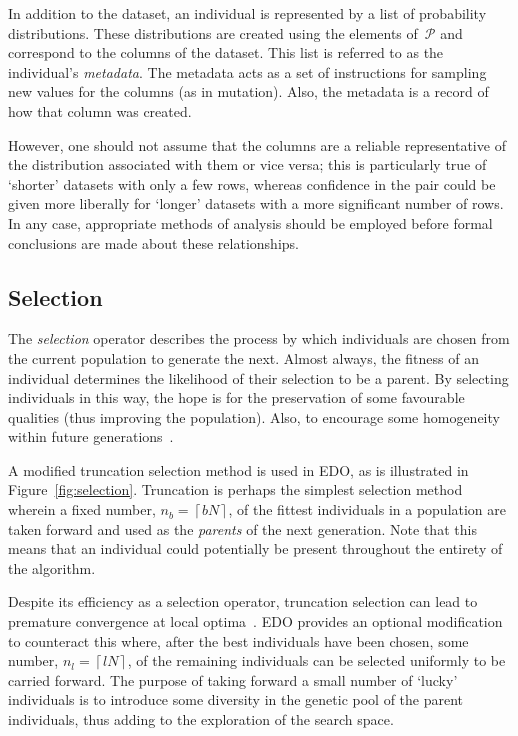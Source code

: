 In addition to the dataset, an individual is represented by a list of
probability distributions. These distributions are created using the elements
of~\(\mathcal{P}\) and correspond to the columns of the dataset. This list is
referred to as the individual's \emph{metadata}. The metadata acts as a set of
instructions for sampling new values for the columns (as in mutation). Also, the
metadata is a record of how that column was created.

However, one should not assume that the columns are a reliable representative of
the distribution associated with them or vice versa; this is particularly true
of `shorter' datasets with only a few rows, whereas confidence in the pair could
be given more liberally for `longer' datasets with a more significant number of
rows. In any case, appropriate methods of analysis should be employed before
formal conclusions are made about these relationships.



\subsection{Selection}

The \emph{selection} operator describes the process by which individuals are
chosen from the current population to generate the next. Almost always, the
fitness of an individual determines the likelihood of their selection to be a
parent. By selecting individuals in this way, the hope is for the preservation
of some favourable qualities (thus improving the population). Also, to encourage
some homogeneity within future generations~\cite{Back1994}.


A modified truncation selection method is used in EDO, as is illustrated in
Figure~\ref{fig:selection}. Truncation is perhaps the simplest selection method
wherein a fixed number, \(n_b = \left\lceil b N\right\rceil\), of the fittest
individuals in a population are taken forward and used as the \emph{parents} of
the next generation. Note that this means that an individual could potentially
be present throughout the entirety of the algorithm.

Despite its efficiency as a selection operator, truncation selection can lead to
premature convergence at local optima~\cite{Jebari2013,Motoki2002}. EDO provides
an optional modification to counteract this where, after the best individuals
have been chosen, some number, \(n_l = \left\lceil l N\right\rceil\), of the
remaining individuals can be selected uniformly to be carried forward. The
purpose of taking forward a small number of `lucky' individuals is to introduce
some diversity in the genetic pool of the parent individuals, thus adding to the
exploration of the search space.


